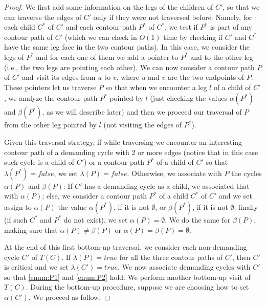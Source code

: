 \documentclass[runningheads]{llncs}
\begin{document}
\begin{proof}
We first add some information on the legs of the children of $C'$, so that we can traverse the edges of $C'$ only if they were not traversed before. Namely, for each child $C^*$ of $C'$ and each contour path $P^*$ of $C^*$, we test if $P^*$ is part of any contour path of $C'$ (which we can check in $O(1)$ time by checking if $C'$ and $C^*$ have the same leg face in the two contour paths). In this case, we consider the legs of $P^*$ and for each one of them we add a pointer to $P^*$ and to the other leg (i.e., the two legs are pointing each other). We can now consider a contour path $P$ of $C'$ and visit its edges from $u$ to $v$, where $u$ and $v$ are the two endpoints of $P$. These pointers let us traverse $P$ so that when we encounter a leg $l$ of a child of $C'$, we analyze the contour path $P^*$ pointed by $l$ (just checking the values $\alpha(P^*)$ and $\beta(P^*)$, as we will describe later) and then we proceed our traversal of $P$ from the other leg pointed by $l$ (not visiting the edges of $P^*$). 

Given this traversal strategy, if while traversing we encounter  an interesting contour path of a demanding cycle with 2 or more edges (notice that in this case such cycle is a child of $C'$) or a contour path $P^*$ of a child of $C'$ so that $\lambda(P^*)=\mathit{false}$, we set $\lambda(P)=\mathit{false}$.
Otherwise, we associate with $P$ the cycles $\alpha(P)$ and $\beta(P)$: If $C'$ has a demanding cycle as a child, we associated that with $\alpha(P)$; else, we consider a contour path $P^*$ of a child $C^*$ of $C'$ and we set assign to $\alpha(P)$ the value $\alpha(P^*)$, if it is not $\emptyset$, or $\beta(P^*)$, if it is not $\emptyset$; finally (if such $C^*$ and $P^*$ do not exist), we set $\alpha(P)=\emptyset$. We do the same for $\beta(P)$, making sure that $\alpha(P)\not= \beta(P)$ or $\alpha(P)= \beta(P)=\emptyset$. 



At the end of this first bottom-up traversal, we consider each non-demanding cycle $C'$ of $T(C)$. If $\lambda(P)=\mathit{true}$ for all the three contour paths of $C'$, then $C'$ is critical and we set $\lambda(C')=\mathit{true}$. We now associate demanding cycles with $C'$ so that \ref{enum:P1} and \ref{enum:P2} hold. We perform another bottom-up visit of $T(C)$. During the bottom-up procedure, suppose we are choosing how to set $\alpha(C')$. We proceed as follow:


\end{proof}
\end{document}
